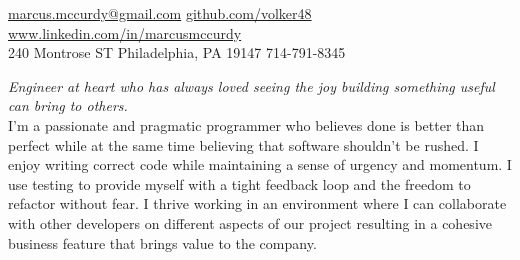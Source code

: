 \documentclass[10pt,a4paper]{article}
\begin{document}
\sloppy  %


\nobreakvspace{0.3em}  %

\noindent\href{mailto:marcus.mccurdy@gmail.com}
{marcus.mccurdy\mbox{}@\mbox{}gmail.com}\sbull
\href{http://github.com/volker48}{github.com/volker48} \sbull
\href{http://www.linkedin.com/in/marcusmccurdy}
    {www.linkedin.com/in/marcusmccurdy}
\\
240 Montrose ST\sbull
Philadelphia, PA 19147 \sbull {}714-791-8345

\spacedhrule{0.9em}{-0.4em}  %


\vspace{-1.3em}  %
\begin{multicols}{2}  %
\noindent \emph{Engineer at heart who has always loved 
seeing the joy building something useful can bring to
others.}
\\

I'm a passionate and pragmatic programmer who believes done is better than 
perfect while at the same time believing that software shouldn't be rushed. 
I enjoy writing correct code while maintaining a sense of urgency and momentum. 
I use testing to provide myself with a tight feedback loop and the freedom to 
refactor without fear. I thrive working in an environment where I can  
collaborate with other developers on different aspects of our project resulting
in a cohesive business feature that brings value to the company.

\end{multicols}


\spacedhrule{0em}{-0.4em}

\end{document}
